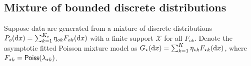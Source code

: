

\subsection{Mixture of bounded discrete distributions}

Suppose data are generated from a mixture of discrete distributions $P_{o}(\mathrm{d} x)=\sum_{k = 1}^{K_{o}}\eta_{ok}F_{ok}(\mathrm{d} x)$ with a finite support $\mathcal{X}$ for all $F_{ok}$. 
Denote the asymptotic fitted Poisson mixture model as $G_{\star}(\mathrm{d} x) = \sum_{k=1}^{K}\eta_{\star k} F_{\star k}(\mathrm{d} x)$, 
where $F_{\star k} = {\sf{Poiss}}(\lambda_{\star k})$.


